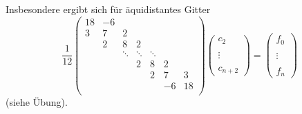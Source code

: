 Insbesondere ergibt sich für äquidistantes Gitter
\begin{equation*}
\frac{1}{12}
\left(\begin{array}{ccccccc}
18& -6&&&&&\\
3&7&2&  &&&\\
&2&8&2  &&&\\
& &\ddots &\ddots &\ddots &&\\
& & & 2&8&2&\\
& & & &2&7&3\\
& & &&&-6&18\\
\end{array}\right) 
\left(\begin{array}{c}
c_2\\ \\ \vdots \\ \\c_{n+2}
\end{array}\right)
=
\left(\begin{array}{c}
f_0\\ \\ \vdots \\ \\f_n
\end{array}\right)
\end{equation*}
(siehe Übung).


